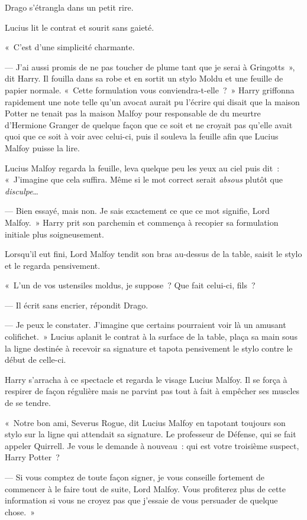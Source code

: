Drago s'étrangla dans un petit rire.

Lucius lit le contrat et sourit sans gaieté.

«~C'est d'une simplicité charmante.

--- J'ai aussi promis de ne pas toucher de plume tant que je serai à Gringotts~», dit Harry. Il fouilla dans sa robe et en sortit un stylo Moldu et une feuille de papier normale. «~Cette formulation vous conviendra-t-elle~?~» Harry griffonna rapidement une note telle qu'un avocat aurait pu l'écrire qui disait que la maison Potter ne tenait pas la maison Malfoy pour responsable de du meurtre d'Hermione Granger de quelque façon que ce soit et ne croyait pas qu'elle avait quoi que ce soit à voir avec celui-ci, puis il souleva la feuille afin que Lucius Malfoy puisse la lire.

Lucius Malfoy regarda la feuille, leva quelque peu les yeux au ciel puis dit~:
«~J'imagine que cela suffira. Même si le mot correct serait \emph{absous} plutôt que \emph{disculpe}…

--- Bien essayé, mais non. Je sais exactement ce que ce mot signifie, Lord Malfoy.~» Harry prit son parchemin et commença à recopier sa formulation initiale plus soigneusement.

Lorsqu'il eut fini, Lord Malfoy tendit son bras au-dessus de la table, saisit le stylo et le regarda pensivement.

«~L'un de vos ustensiles moldus, je suppose~? Que fait celui-ci, fils~?

--- Il écrit sans encrier, répondit Drago.

--- Je peux le constater. J'imagine que certains pourraient voir là un amusant colifichet.~» Lucius aplanit le contrat à la surface de la table, plaça sa main sous la ligne destinée à recevoir sa signature et tapota pensivement le stylo contre le début de celle-ci.

Harry s'arracha à ce spectacle et regarda le visage Lucius Malfoy. Il se força à respirer de façon régulière mais ne parvint pas tout à fait à empêcher ses muscles de se tendre.

«~Notre bon ami, Severus Rogue, dit Lucius Malfoy en tapotant toujours son stylo sur la ligne qui attendait sa signature. Le professeur de Défense, qui se fait appeler Quirrell. Je vous le demande à nouveau~: qui est votre troisième suspect, Harry Potter~?

--- Si vous comptez de toute façon signer, je vous conseille fortement de commencer à le faire tout de suite, Lord Malfoy. Vous profiterez plus de cette information si vous ne croyez pas que j'essaie de vous persuader de quelque chose.~»

